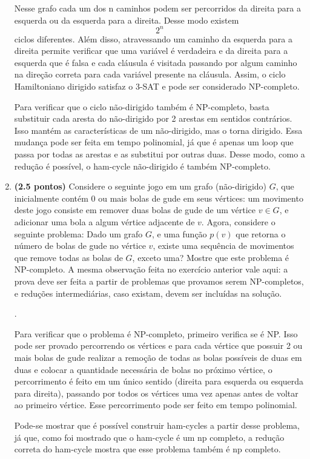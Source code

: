 \documentclass[12pt]{article}
\newcommand{\resposta}[1]{ \noindent {\bf Solução}.{\color{blue} #1}}
\begin{document}
\begin{enumerate}
{Nesse grafo cada um dos n caminhos podem ser percorridos da direita para a esquerda ou da esquerda para a direita. Desse modo existem $$2^n$$ ciclos diferentes. Além disso, atravessando um caminho da esquerda para a direita permite verificar que uma variável é verdadeira e da direita para a esquerda que é falsa e cada cláusula é visitada passando por algum caminho na direção correta para cada variável presente na cláusula. Assim, o ciclo Hamiltoniano dirigido satisfaz o 3-SAT e pode ser considerado NP-completo.

Para verificar que o ciclo não-dirigido também é NP-completo, basta substituir cada aresta do não-dirigido por 2 arestas em sentidos contrários. Isso mantém as características de um não-dirigido, mas o torna dirigido. Essa mudança pode ser feita em tempo polinomial, já que é apenas um loop que passa por todas as arestas e as substitui por outras duas. Desse modo, como a redução é possível, o ham-cycle não-dirigido é também NP-completo.


  }
  
\item {\bf (2.5 pontos)} Considere o seguinte jogo em um grafo
  (não-dirigido) $G$, que inicialmente contém 0 ou mais bolas de gude
  em seus vértices: um movimento deste jogo consiste em remover duas
  bolas de gude de um vértice $v\in G$, e adicionar uma bola a algum
  vértice adjacente de $v$. Agora, considere o seguinte problema: Dado
  um grafo $G$, e uma função $p(v)$ que retorna o número de bolas de
  gude no vértice $v$, existe uma sequência de movimentos que remove
  todas as bolas de $G$, exceto uma? Mostre que este problema é
  NP-completo. A mesma observação feita no exercício anterior vale
  aqui: a prova deve ser feita a partir de problemas que provamos
  serem NP-completos, e reduções intermediárias, caso existam, devem
  ser incluídas na solução.

  \resposta{
    Para verificar que o problema é NP-completo, primeiro verifica se é NP. Isso pode ser provado percorrendo os vértices e para cada vértice que possuir 2 ou mais bolas de gude realizar a remoção de todas as bolas possíveis de duas em duas e colocar a quantidade necessária de bolas no próximo vértice, o percorrimento é feito em um único sentido (direita para esquerda ou esquerda para direita), passando por todos os vértices uma vez apenas antes de voltar ao primeiro vértice. Esse percorrimento pode ser feito em tempo polinomial.

	Pode-se mostrar que é possível construir ham-cycles a partir desse problema, já que, como foi mostrado que o ham-cycle é um np completo, a redução correta do ham-cycle mostra que esse problema também é np completo.
	
}
\end{enumerate}
\end{document}
